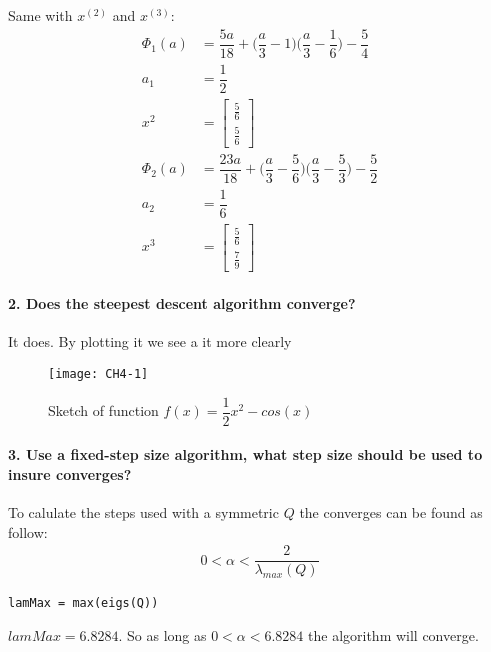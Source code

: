 \documentclass[Main]{subfiles}
\begin{document}
Same with $x^{(2)}$ and $x^{(3)}$:
\begin{align*}
\Phi_1(a) &= \dfrac{5 a}{18} + \bigg(\dfrac{a}{3} - 1\bigg) \bigg(\dfrac{a}{3} - \dfrac{1}{6}\bigg) - \dfrac{5}{4}\\
a_1 &= \dfrac{1}{2} \\
x^2 &= \begin{bmatrix}
\frac{5}{6} \\[0.3em] 
\frac{5}{6} 
\end{bmatrix} 
\\
\Phi_2(a) &= \dfrac{23 a}{18} + \bigg(\dfrac{a}{3} - \dfrac{5}{6}\bigg) \bigg(\dfrac{a}{3} - \dfrac{5}{3}\bigg) - \dfrac{5}{2}\\
a_2 &= \dfrac{1}{6} \\
x^3 &= \begin{bmatrix}
\frac{5}{6} \\[0.3em] 
\frac{7}{9} 
\end{bmatrix}
\end{align*}


\paragraph{2. Does the steepest descent algorithm converge?}
It does.
By plotting it we see a it more clearly

\begin{figure}[hbtp]
\centering
\texttt{[image: CH4-1]}
\vspace{-15pt}
\caption{Sketch of function $f(x) = \dfrac{1}{2}x^2 - cos(x)$}
\label{fig:ch4-1}
\end{figure}



\paragraph{3. Use a fixed-step size algorithm, what step size should be used to insure converges?}
To calulate the steps used with a symmetric  $Q$ the converges can be found as follow:
\begin{align*}
0 < \alpha < \dfrac{2}{\lambda_{max} (Q)}
\end{align*}	

\begin{lstlisting}[caption=Max, style=Code-Matlab, label=lst:CH4-3]
lamMax = max(eigs(Q))
\end{lstlisting}
$lamMax = 6.8284$. 
So as long as $0<\alpha<6.8284$ the algorithm will converge.
\end{document}
